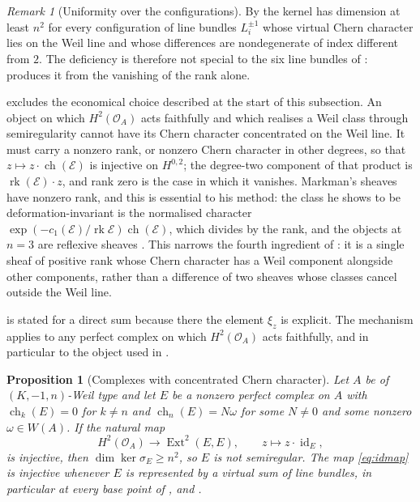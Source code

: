\documentclass[11pt,reqno]{amsart}
\theoremstyle{plain}
\newtheorem{proposition}[theorem]{Proposition}
\theoremstyle{definition}
\theoremstyle{remark}
\newtheorem{remark}[theorem]{Remark}
\newcommand{\cE}{\mathcal{E}}
\newcommand{\cO}{\mathcal{O}}
\newcommand{\HW}{W}                      %
\DeclareMathOperator{\ch}{ch}
\DeclareMathOperator{\rk}{rk}
\DeclareMathOperator{\Ext}{Ext}
\DeclareMathOperator{\id}{id}
\begin{document}
\begin{remark}[Uniformity over the configurations]
\label{rem:familyuniform}
By  the kernel has dimension at least $n^{2}$ for
every configuration of line bundles $L_{i}^{\pm1}$ whose virtual Chern
character lies on the Weil line and whose differences are nondegenerate of
index different from $2$. The deficiency is therefore not special to the six
line bundles of \cite[Proposition~4.14]{paperII}:  produces it
from the vanishing of the rank alone.

 excludes the economical choice described at the start of
this subsection. An object on which $H^{2}(\cO_{A})$ acts faithfully and which
realises a Weil class through semiregularity cannot have its Chern character
concentrated on the Weil line. It must carry a nonzero rank, or nonzero Chern
character in other degrees, so that $z\mapsto z\cdot\ch(\cE)$ is injective on
$H^{0,2}$; the degree-two component of that product is $\rk(\cE)\cdot z$, and
rank zero is the case in which it vanishes. Markman's sheaves have nonzero
rank, and this is essential to his method: the class he shows to be
deformation-invariant is the normalised character
$\exp(-c_{1}(\cE)/\rk\cE)\ch(\cE)$, which divides by the rank, and the objects
at $n=3$ are reflexive sheaves \cite{Mar25a,Mar25b}. This narrows the fourth
ingredient of : it is a single sheaf of positive rank
whose Chern character has a Weil component alongside other components, rather
than a difference of two sheaves whose classes cancel outside the Weil line.
\end{remark}

 is stated for a direct sum because there the element
$\xi_{z}$ is explicit. The mechanism applies to any perfect complex on which
$H^{2}(\cO_{A})$ acts faithfully, and in particular to the object used in
.

\begin{proposition}[Complexes with concentrated Chern character]
\label{prop:concentrated}
Let $A$ be of $(K,-1,n)$-Weil type and let $E$ be a nonzero perfect complex on
$A$ with $\ch_{k}(E)=0$ for $k\ne n$ and $\ch_{n}(E)=N\omega$ for some
$N\ne0$ and some nonzero $\omega\in\HW(A)$. If the natural map
\begin{equation}\label{eq:idmap}
  H^{2}(\cO_{A})\longrightarrow\Ext^{2}(E,E),\qquad z\longmapsto z\cdot\id_{E},
\end{equation}
is injective, then $\dim\ker\sigma_{E}\ge n^{2}$, so $E$ is not semiregular.
The map \eqref{eq:idmap} is injective whenever $E$ is represented by a virtual
sum of line bundles, in particular at every base point of
,  and .
\end{proposition}
\end{document}
